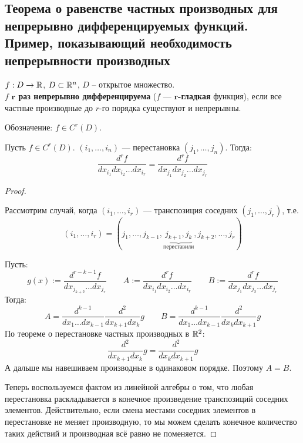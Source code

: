 \subsection{Теорема о равенстве частных производных для непрерывно дифференцируемых функций. Пример, показывающий необходимость непрерывности производных }

\begin{conj}
    $f : D \to \mathbb{R}$, $D \subset \mathbb{R}^n$, $D$ -- открытое множество. \\
    $f$ \textbf{$\mathbf{r}$ раз непрерывно дифференцируема} 
    ($f$ --- \textbf{$\mathbf{r}$-гладкая} функция), если 
    все частные производные до $r$-го порядка существуют и
    непрерывны.

    Обозначение: $f \in C^r(D)$.
\end{conj}

\begin{theorem}
    Пусть $f \in C^r(D)$. $(i_1, \dots, i_n)$ --- перестановка 
    $(j_1, \dots, j_n)$. Тогда:
    $$ \frac{d^r f}{d x_{i_1} d x_{i_2} \dots d x_{i_r}} = 
    \frac{d^r f}{d x_{j_1} d x_{j_2} \dots d x_{j_r}} $$
\end{theorem}
\begin{proof} $ $

    Рассмотрим случай, когда $(i_1, \dots, i_r)$ --- транспозиция
    соседних $(j_1, \dots, j_r)$, т.е. 
    $$(i_1, \dots, i_r) = (j_1, \dots, j_{k - 1}, 
    \underbrace{j_{k + 1}, j_k}_{\text{переставили}}, 
    j_{k + 2}, \dots, j_r)$$

    Пусть:
    $$ g(x) := \frac{d^{r - k - 1} f}{d x_{j_{k + 2}} \dots d x_{j_r}}
    \quad \quad
    A := \frac{d^r f}{d x_{i_1} d x_{i_2} \dots d x_{i_r}} \quad
    \quad B := \frac{d^r f}{d x_{j_1} d x_{j_2} \dots d x_{j_r}} $$
    Тогда:
    $$ A = \frac{d^{k-1}}{d x_1 \dots d x_{k-1}} 
    \frac{d^{2}}{d x_{k+1} d x_{k}} g \quad \quad 
    B = \frac{d^{k-1}}{d x_1 \dots d x_{k-1}} 
    \frac{d^{2}}{d x_{k} d x_{k+1}} g$$
    По теореме о перестановке частных производных в $\mathbb{R}^2$:
    $$ \frac{d^{2}}{d x_{k+1} d x_{k}} g = 
    \frac{d^{2}}{d x_{k} d x_{k+1}} g $$
    А дальше мы навешиваем производные в одинаковом порядке.
    Поэтому $A = B$.

    Теперь воспользуемся фактом из линейной алгебры о том, что любая
    перестановка раскладывается в конечное произведение транспозиций
    соседних элементов. Действительно, если смена местами соседних
    элементов в перестановке не меняет производную, 
    то мы можем сделать конечное
    количество таких действий и производная всё равно не поменяется.
\end{proof}